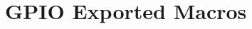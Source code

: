 \hypertarget{group___g_p_i_o_ex___exported___macros}{}\section{G\+P\+IO Exported Macros}
\label{group___g_p_i_o_ex___exported___macros}
